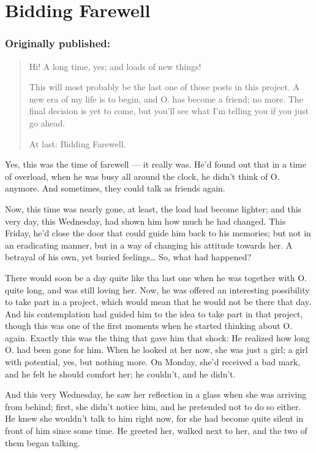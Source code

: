 \chapter{Bidding Farewell}
\label{cha:bidding-farewell}
\subsection*{Originally published: }
\begin{quote}
Hi! A long time, yes; and loads of new things!

This will most probably be the last one of those posts in this project. A new era of my life is to begin, and O. has become a friend; no more. The final decision is yet to come, but you'll see what I'm telling you if you just go ahead. 

At last: Bidding Farewell.
\end{quote}

Yes, this was the time of farewell --- it really was. He'd found out that in a time of overload, when he was busy all around the clock, he didn't think of O. anymore.
And sometimes, they could talk as friends again.

Now, this time was nearly gone, at least, the load had become lighter; and this very day, this Wednesday, had shown him how much he had changed. 
This Friday, he'd close the door that could guide him back to his memories; but not in an eradicating manner, but in a way of changing his attitude towards her. A betrayal of his own, yet buried feelings\ldots
So, what had happened?

There would soon be a day quite like tha last one when he was together with O. quite long, and was still loving her. Now, he was offered an interesting possibility to take part in a project, which would mean that he would not be there that day. And his contemplation had guided him to the idea to take part in that project, though this was one of the first moments when he started thinking about O. again. Exactly this was the thing that gave him that shock: He realized how long O. had been gone for him. When he looked at her now, she was just a girl; a girl with potential, yes, but nothing more. 
On Monday, she'd received a bad mark, and he felt he should comfort her; he couldn't, and he didn't.

And this very Wednesday, he saw her reflection in a glass when she was arriving from behind; first, she didn't notice him, and he pretended not to do so either. 
He knew she wouldn't talk to him right now, for she had become quite silent in front of him since some time.
He greeted her, walked next to her, and the two of them began talking.

